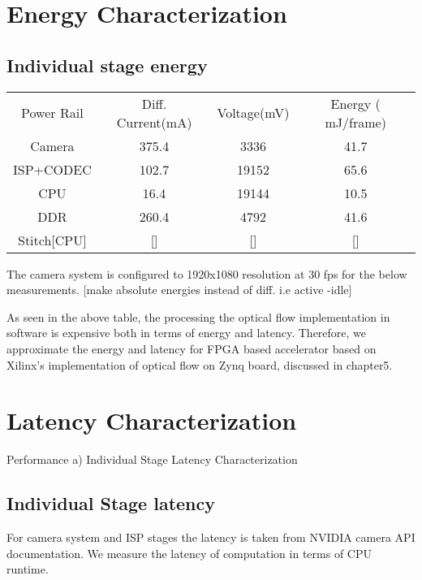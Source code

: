 \section{Energy Characterization}
\subsection{Individual stage energy}
	\begin{tabular}{c|c|c|c}
	Power Rail & Diff. Current(mA) & Voltage(mV) & Energy ( mJ/frame) \\
	Camera & 375.4 & 3336 & 41.7 \\
	ISP+CODEC & 102.7 & 19152 & 65.6 \\
	CPU & 16.4 & 19144 & 10.5 \\
	DDR & 260.4 & 4792 & 41.6 \\
	Stitch[CPU] & [] & [] & [] \\
	\end{tabular} \newline \newline
	The camera system is configured to 1920x1080 resolution at 30 fps for the below measurements. [make absolute energies instead of diff. i.e active -idle]\newline
	
	As seen in the above table, the processing  the optical flow implementation in software is expensive both in terms of energy and latency. Therefore, we approximate the energy and latency for FPGA based accelerator based on Xilinx's implementation of optical flow on Zynq board, discussed in chapter5.\newline

	
\section{Latency Characterization}

 Performance \newline
	a) Individual Stage Latency Characterization
	

\subsection{Individual Stage latency}
For camera system and ISP stages the latency is taken from NVIDIA camera API documentation. We measure the latency of computation in terms of CPU runtime. 

